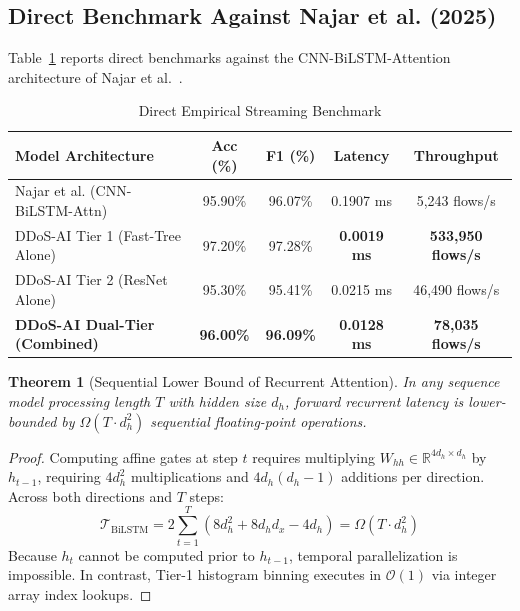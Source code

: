 \documentclass[journal]{IEEEtran}
\newtheorem{theorem}{Theorem}
\begin{document}
\subsection{Direct Benchmark Against Najar et al. (2025)}
Table~\ref{tab:ashfaq_comparison} reports direct benchmarks against the CNN-BiLSTM-Attention architecture of Najar et al.~\cite{najar2025ddos}.

\begin{table}[h]
\centering
\caption{Direct Empirical Streaming Benchmark}
\label{tab:ashfaq_comparison}
\begin{tabular}{lcccc}
\toprule
\textbf{Model Architecture} & \textbf{Acc (\%)} & \textbf{F1 (\%)} & \textbf{Latency} & \textbf{Throughput} \\
\midrule
Najar et al. (CNN-BiLSTM-Attn)~\cite{najar2025ddos} & 95.90\% & 96.07\% & 0.1907 ms & 5,243 flows/s \\
DDoS-AI Tier 1 (Fast-Tree Alone) & 97.20\% & 97.28\% & \textbf{0.0019 ms} & \textbf{533,950 flows/s} \\
DDoS-AI Tier 2 (ResNet Alone) & 95.30\% & 95.41\% & 0.0215 ms & 46,490 flows/s \\
\textbf{DDoS-AI Dual-Tier (Combined)} & \textbf{96.00\%} & \textbf{96.09\%} & \textbf{0.0128 ms} & \textbf{78,035 flows/s} \\
\bottomrule
\end{tabular}
\end{table}

\begin{theorem}[Sequential Lower Bound of Recurrent Attention]
In any sequence model processing length $T$ with hidden size $d_h$, forward recurrent latency is lower-bounded by $\Omega(T \cdot d_h^2)$ sequential floating-point operations.
\end{theorem}
\begin{proof}
Computing affine gates at step $t$ requires multiplying $W_{hh} \in \mathbb{R}^{4d_h \times d_h}$ by $h_{t-1}$, requiring $4d_h^2$ multiplications and $4d_h(d_h-1)$ additions per direction. Across both directions and $T$ steps:
\begin{equation}
\mathcal{T}_{\text{BiLSTM}} = 2 \sum_{t=1}^T \left(8d_h^2 + 8d_h d_x - 4d_h\right) = \Omega(T \cdot d_h^2)
\end{equation}
Because $h_t$ cannot be computed prior to $h_{t-1}$, temporal parallelization is impossible. In contrast, Tier-1 histogram binning executes in $\mathcal{O}(1)$ via integer array index lookups.
\end{proof}
\end{document}
